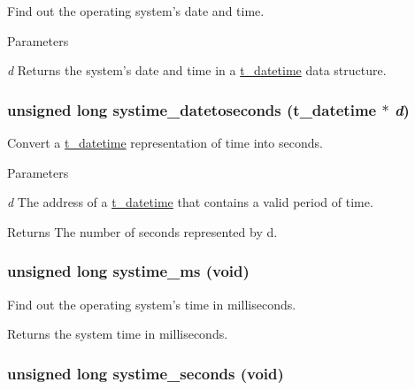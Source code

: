 Find out the operating system’s date and time. 
\begin{DoxyParams}{Parameters}
\item[{\em d}]Returns the system’s date and time in a \hyperlink{structt__datetime}{t\_\-datetime} data structure. \end{DoxyParams}
\hypertarget{group__systime_gab102340f92f3b8136629cf88a57e61a0}{
\subsubsection[{systime\_\-datetoseconds}]{\setlength{\rightskip}{0pt plus 5cm}unsigned long systime\_\-datetoseconds ({\bf t\_\-datetime} $\ast$ {\em d})}}
\label{group__systime_gab102340f92f3b8136629cf88a57e61a0}


Convert a \hyperlink{structt__datetime}{t\_\-datetime} representation of time into seconds. 
\begin{DoxyParams}{Parameters}
\item[{\em d}]The address of a \hyperlink{structt__datetime}{t\_\-datetime} that contains a valid period of time. \end{DoxyParams}
\begin{DoxyReturn}{Returns}
The number of seconds represented by d. 
\end{DoxyReturn}
\hypertarget{group__systime_ga9f23c7624ff113b985a34797bbf2f728}{
\subsubsection[{systime\_\-ms}]{\setlength{\rightskip}{0pt plus 5cm}unsigned long systime\_\-ms (void)}}
\label{group__systime_ga9f23c7624ff113b985a34797bbf2f728}


Find out the operating system’s time in milliseconds. \begin{DoxyReturn}{Returns}
the system time in milliseconds. 
\end{DoxyReturn}
\hypertarget{group__systime_ga8517f74817ccaaca5eb4bd4e82823bf5}{
\subsubsection[{systime\_\-seconds}]{\setlength{\rightskip}{0pt plus 5cm}unsigned long systime\_\-seconds (void)}}
\label{group__systime_ga8517f74817ccaaca5eb4bd4e82823bf5}


